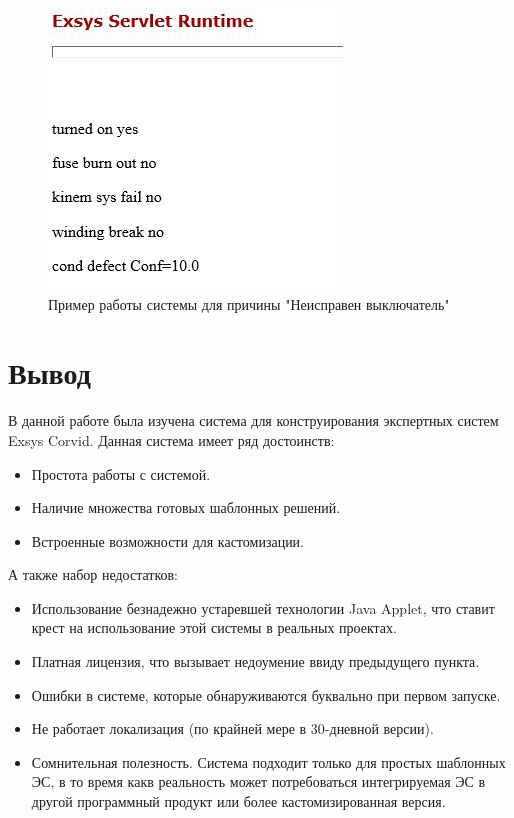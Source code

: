 \documentclass[14pt,a4paper,report]{report}
\begin{document}
\begin{figure}[h!]
	\centering
	\includegraphics[scale = 0.7]{images/7_1.jpg}
	\caption{Пример работы системы для причины "Неисправен выключатель"}
\end{figure}




\section{Вывод}

В данной работе была изучена система для конструирования экспертных систем Exsys Corvid. Данная система имеет ряд достоинств:

\begin{itemize}
	\item Простота работы с системой.
	\item Наличие множества готовых шаблонных решений.
	\item Встроенные возможности для кастомизации.
\end{itemize}

А также набор недостатков:

\begin{itemize}
	\item Использование безнадежно устаревшей технологии Java Applet, что ставит крест на использование этой системы в реальных проектах.
	\item Платная лицензия, что вызывает недоумение ввиду предыдущего пункта.
	\item Ошибки в системе, которые обнаруживаются буквально при первом запуске.
	\item Не работает локализация (по крайней мере в 30-дневной версии).
	\item Сомнительная полезность. Система подходит только для простых шаблонных ЭС, в то время какв реальность может потребоваться интегрируемая ЭС в другой программный продукт или более кастомизированная версия.
\end{itemize}
\end{document}
